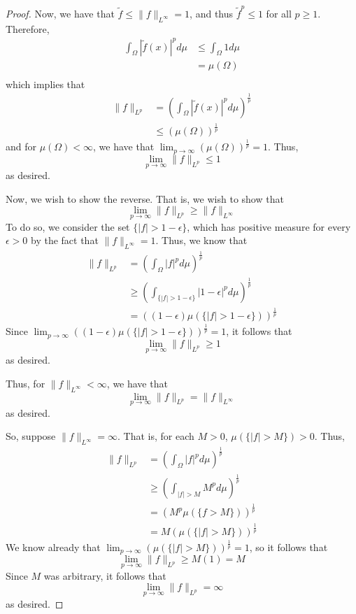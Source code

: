 \documentclass[fontsize=11pt]{scrartcl} %
\numberwithin{equation}{section} %
\numberwithin{figure}{section} %
\numberwithin{table}{section} %
\begin{document}
\begin{proof}
    Now, we have that $\tilde{f} \leq \|f\|_{L^{\infty}} = 1$, and thus
    $\tilde{f}^p\leq 1$ for all $p\geq 1$. Therefore,
    \[
        \begin{aligned}
            \int_{\Omega}|\tilde{f}(x)|^pd\mu &\leq \int_{\Omega}1d\mu\\
                                            &=\mu(\Omega)\\
        \end{aligned}
    \]
    which implies that
    \[
        \begin{aligned}
        \|f\|_{L^p} &=
        \left(\int_{\Omega}|\tilde{f}(x)|^pd\mu\right)^{\frac{1}{p}}\\
            &\leq (\mu(\Omega))^{\frac{1}{p}}
        \end{aligned}
    \]
    and for $\mu(\Omega)<\infty$, we have that
    $\lim_{p\to\infty}(\mu(\Omega))^{\frac{1}{p}} = 1$.
    Thus,
    \[
        \lim_{p\to\infty}\|f\|_{L^p} \leq 1
    \]
    as desired.

    Now, we wish to show the reverse. That is, we wish to show that
    \[
        \lim_{p\to\infty}\|f\|_{L^p} \geq \|f\|_{L^{\infty}}
    \]
    To do so, we consider the set $\{|f|>1-\epsilon\}$, which has positive
    measure for every $\epsilon>0$ by the fact that $\|f\|_{L^{\infty}} = 1$.
    Thus, we know that
    \[
        \begin{aligned}
            \|f\|_{L^p} &=\left(\int_{\Omega}|f|^pd\mu\right)^{\frac{1}{p}}\\
                        &\geq
                        \left(\int_{\{|f|>1-\epsilon\}}|1-\epsilon|^pd\mu\right)^{\frac{1}{p}}\\
                        &=((1-\epsilon)\mu(\{|f|>1-\epsilon\}))^{\frac{1}{p}}
        \end{aligned}
    \]
    Since $\lim_{p\to\infty}((1-\epsilon)\mu(\{|f|>1-\epsilon\}))^{\frac{1}{p}}
    = 1$, it follows that
    \[
        \lim_{p\to\infty}\|f\|_{L^p} \geq 1
    \]
    as desired.

    Thus, for $\|f\|_{L^{\infty}} < \infty$, we have that
    \[
        \lim_{p\to\infty}\|f\|_{L^p} = \|f\|_{L^{\infty}}
    \]
    as desired.

    So, suppose $\|f\|_{L^{\infty}} = \infty$. That is, for each $M>0$,
    $\mu(\{|f|>M\})>0$. Thus,
    \[
        \begin{aligned}
            \|f\|_{L^p} &= \left(\int_{\Omega}|f|^pd\mu\right)^{\frac{1}{p}}\\
                        &\geq \left(\int_{|f|>M}M^pd\mu\right)^{\frac{1}{p}}\\
                        &= \left(M^p\mu(\{f>M\})\right)^{\frac{1}{p}}\\
                        &= M(\mu(\{|f|>M\}))^{\frac{1}{p}}
        \end{aligned}
    \]
    We know already that $\lim_{p\to\infty}(\mu(\{|f|>M\}))^{\frac{1}{p}} = 1$,
    so it follows that
    \[
        \lim_{p\to\infty}\|f\|_{L^p} \geq M(1) = M
    \]
    Since $M$ was arbitrary, it follows that
    \[
        \lim_{p\to\infty}\|f\|_{L^p} = \infty
    \]
    as desired.
\end{proof}
\end{document}
